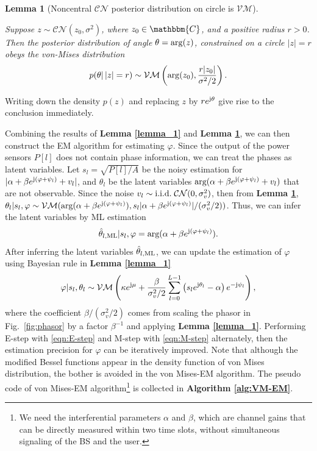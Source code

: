 \documentclass[12pt,draftclsnofoot,journal,onecolumn]{IEEEtran}
\newtheorem{lemma}{\bf Lemma}
\theoremstyle{nonumberplain}
\def \arg {\text{arg}}
\def \CN {\mathcal{CN}}
\def \VM {\mathcal{VM}}
\begin{document}
    \begin{lemma}[Noncentral $\CN$ posterior distribution on circle is $\VM$]\label{lemma_2} \mbox{}\par
        Suppose $z \sim \CN(z_0, \sigma^2)$, where $z_0 \in \mathbbm{C}$, and a positive radius $r>0$. Then the posterior distribution of angle $\theta= {\rm arg} (z)$, constrained on a circle $|z|=r$ obeys the von-Mises distribution
        \begin{equation}
            p(\theta |\, |z|=r) \sim \VM\left({\rm arg}(z_0), \frac{r|z_0|}{\sigma^2/2}\right).
        \end{equation}
    \end{lemma}
    \begin{IEEEproof}
        Writing down the density $p(z)$ and replacing $z$ by $r e^{{\rm j} \theta}$ give rise to the conclusion immediately. 
    \end{IEEEproof}
    Combining the results of {\bf Lemma \ref{lemma_1}} and {\bf Lemma \ref{lemma_2}}, we can then construct the EM algorithm for estimating $\varphi$. Since the output of the power sensors $P[l]$ does not contain phase information, we can treat the phases as latent variables. Let $s_l = \sqrt{P[l]/A}$ be the noisy estimation for $|\alpha + \beta e^{{\rm j} (\varphi + \psi_l)} + v_l|$, and $\theta_l$ be the latent variables $\arg (\alpha + \beta e^{{\rm j} (\varphi + \psi_l)} + v_l)$ that are not observable. 
    Since the noise $v_l \sim {\rm i.i.d.}\;\CN(0, \sigma_v^2)$, then from {\bf Lemma \ref{lemma_2}}, $\theta_l | s_l, \varphi \sim \VM(\arg(\alpha + \beta e^{{\rm j} (\varphi + \psi_l)}), s_l |\alpha + \beta e^{{\rm j} (\varphi + \psi_l)}|/(\sigma_v^2/2))$. Thus, we can infer the latent variables by ML estimation 
    \begin{equation}
        \hat{\theta}_{l, {\rm ML}} | s_l, \varphi = \arg(\alpha + \beta e^{{\rm j} (\varphi + \psi_l)}).
        \label{eqn:E-step}
    \end{equation}
    After inferring the latent variables $\hat{\theta}_{l, {\rm ML}}$, we can update the estimation of $\varphi$ using Bayesian rule in {\bf Lemma \ref{lemma_1}}
    \begin{equation}
        \varphi | s_l, \theta_l \sim \VM\left( \kappa e^{{\rm j} \mu} + \frac{\beta}{\sigma_v^2/2}\sum_{l=0}^{L-1}{\left(s_l e^{{\rm j}\theta_l}-\alpha\right)e^{-{\rm j} \psi_l}}\right),
        \label{eqn:M-step}
    \end{equation}
    where the coefficient $\beta/(\sigma_v^2/2)$ comes from scaling the phasor in Fig.~\ref{fig:phasor} by a factor $\beta^{-1}$ and applying {\bf Lemma \ref{lemma_1}}.
    Performing E-step with \eqref{eqn:E-step} and M-step with \eqref{eqn:M-step} alternately, then the estimation precision for $\varphi$ can be iteratively improved. Note that although the modified Bessel functions appear in the density function of von Mises distribution, the bother is avoided in the von Mises-EM algorithm. The pseudo code of von Mises-EM algorithm\footnote{We need the interferential parameters $\alpha$ and $\beta$, which are channel gains that can be directly measured within two time slots, without simultaneous signaling of the BS and the user. } is collected in {\bf Algorithm \ref{alg:VM-EM}}.
\end{document}
